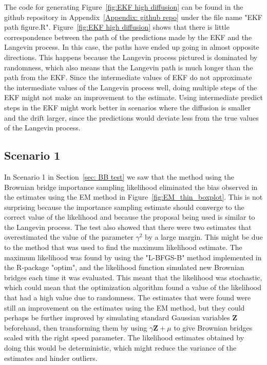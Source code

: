 The code for generating Figure~\ref{fig:EKF high diffusion} can be found in the github repository in Appendix~\ref{Appendix: github repo} under the file name "EKF path figure.R". Figure~\ref{fig:EKF high diffusion} shows that there is little correspondence between the path of the predictions made by the EKF and the Langevin process. In this case, the paths have ended up going in almost opposite directions. This happens because the Langevin process pictured is dominated by randomness, which also means that the Langevin path is much longer than the path from the EKF. Since the intermediate values of EKF do not approximate the intermediate values of the Langevin process well, doing multiple steps of the EKF might not make an improvement to the estimate. Using intermediate predict steps in the EKF might work better in scenarios where the diffusion is smaller and the drift larger, since the predictions would deviate less from the true values of the Langevin process.



\subsection{Scenario 1}
\label{subsec: Scenario 1 interpretation}
In Scenario 1 in Section~\ref{sec: BB test} we saw that the method using the Brownian bridge importance sampling likelihood eliminated the bias observed in the estimates using the EM method in Figure~\ref{fig:EM_thin_boxplot}. This is not surprising because the importance sampling estimate should converge to the correct value of the likelihood and because the proposal being used is similar to the Langevin process. The test also showed that there were two estimates that overestimated the value of the parameter $\gamma^2$ by a large margin. This might be due to the method that was used to find the maximum likelihood estimate. The maximum likelihood was found by using the "L-BFGS-B" method implemented in the R-package "optim", and the likelihood function simulated new Brownian bridges each time it was evaluated. This meant that the likelihood was stochastic, which could mean that the optimization algorithm found a value of the likelihood that had a high value due to randomness. The estimates that were found were still an improvement on the estimates using the EM method, but they could perhaps be further improved by simulating standard Gaussian variables $\textbf{Z}$ beforehand, then transforming them by using $\gamma \textbf{Z} +\mu$ to give Brownian bridges scaled with the right speed parameter. The likelihood estimates obtained by doing this would be deterministic, which might reduce the variance of the estimates and hinder outliers.



